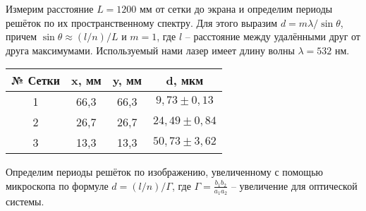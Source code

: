 \documentclass{article}
\begin{document}
  Измерим расстояние $L = 1200$ мм от сетки до экрана и определим периоды решёток по их пространственному спектру. Для этого выразим $d = m \lambda / \sin \theta$, причем $\sin \theta \approx (l/n)/L$ и $m = 1$, где $l$ -- расстояние между удалёнными друг от друга максимумами. Используемый нами лазер имеет длину волны $\lambda = 532$ нм.
  
\begin{table}[]
\centering
\begin{tabular}{|c|c|c|c|}
\hline
№ Сетки & x, мм & y, мм & d, мкм             \\ \hline
1       & 66,3  & 66,3  & $9,73\pm 0,13$     \\ \hline
2       & 26,7  & 26,7  & $24,49 \pm 0,84$   \\ \hline
3       & 13,3  & 13,3  & $ 50,73 \pm 3,62 $ \\ \hline
\end{tabular}
\end{table}
  
  Определим периоды решёток по изображению, увеличенному с помощью микроскопа по формуле $d = (l/n)/\Gamma$, где $\Gamma = \frac{b_1b_2}{a_1a_2}$ -- увеличение для оптической системы.

 
\end{document}
